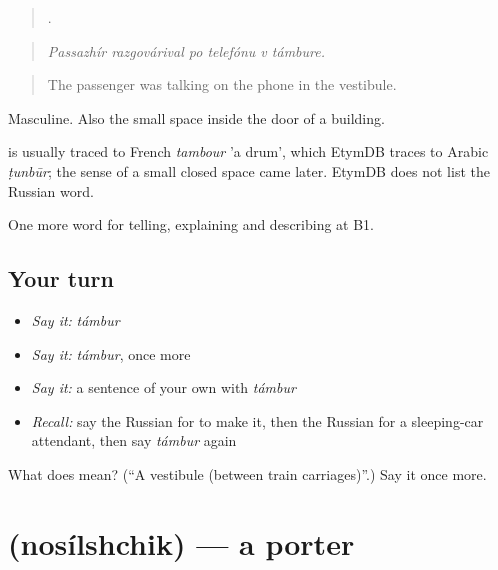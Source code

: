 \begin{quote}
     .
\end{quote}

\begin{quote}
\emph{Passazhír razgovárival po telefónu v támbure.}
\end{quote}

\begin{quote}
The passenger was talking on the phone in the vestibule.
\end{quote}

Masculine. Also the small space inside the door of a building.

\begin{cousinweb}
\emph{} is usually traced to French \emph{tambour} 'a drum', which EtymDB traces to Arabic \emph{ṭunbūr}; the sense of a small closed space came later. EtymDB does not list the Russian word.
\end{cousinweb}

\begin{grammarlens}[title={What you've built}]
One more word for telling, explaining and describing at B1.
\end{grammarlens}

\subsection*{Your turn}
\begin{itemize}
\raggedright
  \item \emph{Say it:} \emph{támbur}
  \item \emph{Say it:} \emph{támbur}, once more
  \item \emph{Say it:} a sentence of your own with \emph{támbur}
  \item \emph{Recall:} say the Russian for to make it, then the Russian for a sleeping-car attendant, then say \emph{támbur} again
\end{itemize}

\begin{tcolorbox}[breakable,colback=teal!4,colframe=teal!35!black,title={Before you move on}]
What does  mean? (\textquotedblleft{}A vestibule (between train carriages)\textquotedblright{}.) Say it once more.
\end{tcolorbox}
\section[\texorpdfstring{\ru{носильщик} (nosílshchik)}{носильщик (nosílshchik)}]{ (nosílshchik) — a porter}

